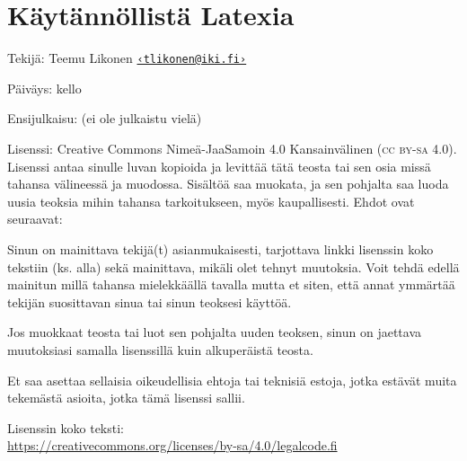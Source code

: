 
\null\vfill

{
  \setlength{\parindent}{0em}
  \setlength{\parskip}{1.2ex plus .1ex}
  \RaggedRight

  \section*{Käytännöllistä Latexia}

  Tekijä: Teemu Likonen
  \href{mailto:tlikonen@iki.fi}{\nolinkurl{‹tlikonen@iki.fi›}}

  Päiväys: \DTMtoday{} kello \DTMcurrenttime{}

  Ensijulkaisu: (ei ole julkaistu vielä)

  Lisenssi: Creative Commons Nimeä-Jaa\-Samoin 4.0 Kansainvälinen
  (\textsc{cc by-sa} 4.0). Lisenssi antaa sinulle luvan kopioida ja
  levittää tätä teosta tai sen osia missä tahansa välineessä ja
  muodossa. Sisältöä saa muokata, ja sen pohjalta saa luoda uusia
  teoksia mihin tahansa tarkoitukseen, myös kaupallisesti. Ehdot ovat
  seuraavat:

  \begin{list}{\textbullet}{
      \setlength{\leftmargin}{1em}
      \setlength{\topsep}{0ex}
      \setlength{\partopsep}{0ex}
      \setlength{\itemsep}{0ex}
      \setlength{\parsep}{\parskip}
    }
  \item Sinun on mainittava tekijä(t) asianmukaisesti, tarjottava linkki
    lisenssin koko tekstiin (ks. alla) sekä mainittava, mikäli olet
    tehnyt muutoksia. Voit tehdä edellä mainitun millä tahansa
    mielekkäällä tavalla mutta et siten, että annat ymmärtää tekijän
    suosittavan sinua tai sinun teoksesi käyttöä.
  \item Jos muokkaat teosta tai luot sen pohjalta uuden teoksen, sinun on
    jaettava muutoksiasi samalla lisenssillä kuin alkuperäistä teosta.
  \item Et saa asettaa sellaisia oikeudellisia ehtoja tai teknisiä
    estoja, jotka estävät muita tekemästä asioita, jotka tämä lisenssi
    sallii.
  \end{list}

  Lisenssin koko teksti: \\
  \url{https://creativecommons.org/licenses/by-sa/4.0/legalcode.fi}

}
